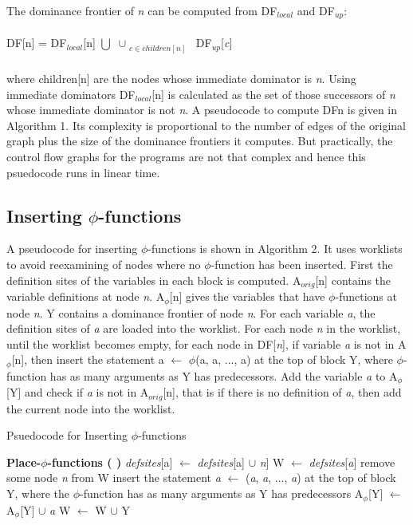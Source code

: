 \documentclass[10pt, oneside, a4paper]{article}
\begin{document}
The dominance frontier of \emph{n} can be computed from DF$_{local}$ and DF$_{up}$:\\\\
DF[n] = DF$_{local}$[n] $\bigcup$ $\cup_{\substack{c{\in}children[n]}}$ DF$_{up}$[\emph{c}]\\\\
where children[n] are the nodes whose immediate dominator is \emph{n}.  Using immediate dominators DF$_{local}$[n] is calculated as the set of those successors of \emph{n} whose immediate dominator is not \emph{n}.  A pseudocode to compute DFn is given in Algorithm 1.  Its complexity is proportional to the number of edges of the original graph plus the size of the dominance frontiers it computes.  But practically, the control flow graphs for the programs are not that complex and hence this psuedocode runs in linear time.

\subsection{Inserting $\phi$-functions}
A pseudocode for inserting $\phi$-functions is shown in Algorithm 2.  It uses worklists to avoid reexamining of nodes where no $\phi$-function has been inserted.  First the definition sites of the variables in each block is computed.  A$_{orig}$[n] contains the variable definitions at node \emph{n}.  A$_{\phi}$[n] gives the variables that have $\phi$-functions at node \emph{n}.  Y contains a dominance frontier of node \emph{n}.  For each variable \emph{a}, the definition sites of \emph{a} are loaded into the worklist.  For each node \emph{n} in the worklist, until the worklist becomes empty,  for each node in DF[\emph{n}], if variable \emph{a} is not in A$_{\phi}$[n], then insert the statement a $\leftarrow$ $\phi$(a, a, ..., a) at the top of block Y, where $\phi$-function has as many arguments as Y has predecessors.  Add the variable \emph{a} to A$_{\phi}$[Y] and check if \emph{a} is not in A$_{orig}$[n], that is if there is no definition of \emph{a}, then add the current node into the worklist.

\begin{algorithm}
\caption{Psuedocode for Inserting $\phi$-functions}
\label{alg2}
\begin{algorithmic}[1]
\STATE \textbf{Place-$\phi$-functions ( )}
\STATE \emph{defsites}[a] $\leftarrow$ \emph{defsites}[a] $\cup$ {\emph{n}]}
\ENDFOR
\ENDFOR
{}
\STATE W $\leftarrow$ \emph{defsites}[\emph{a}]
\STATE remove some node \emph{n} from W
\STATE insert the statement \emph{a} $\leftarrow$ (\emph{a}, \emph{a}, ..., \emph{a}) at the top of block Y, where the $\phi$-function has as many arguments as Y has predecessors
\STATE A$_{\phi}$[Y] $\leftarrow$ A$_{\phi}$[Y] $\cup$ {\emph{a}}
\STATE W $\leftarrow$ W $\cup$ {Y}
\ENDIF
\ENDIF
\ENDFOR
\ENDWHILE
\ENDFOR
\end{algorithmic}
\end{algorithm}
\end{document}
